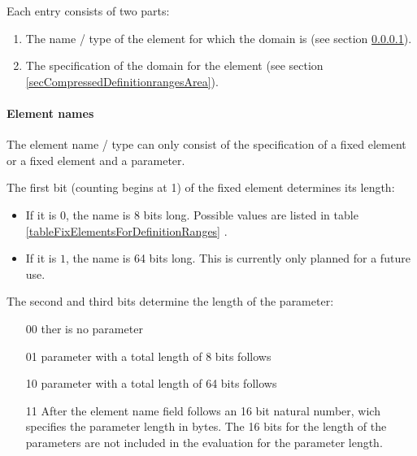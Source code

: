 \bigskip\noindent
Each entry consists of two parts:
\begin{enumerate}
 \item The name / type of the element for which the domain is (see section \ref{secCompressedDefinitionrangesElements}).
 \item The specification of the domain for the element (see section \ref{secCompressedDefinitionrangesArea}).
\end{enumerate}


\paragraph{Element names}
\label{secCompressedDefinitionrangesElements}

The element name / type can only consist of the specification of a fixed element or a fixed element and a parameter.

\bigskip\noindent
The first bit (counting begins at 1) of the fixed element determines its length:
\begin{itemize}
 \item If it is $0$, the name is 8 bits long. Possible values are listed in table \ref{tableFixElementsForDefinitionRanges} .
 \item If it is $1$, the name is 64 bits long. This is currently only planned for a future use.
\end{itemize}

\bigskip\noindent
The second and third bits determine the length of the parameter:
\begin{itemize}
 \item[00] ther is no parameter
 \item[01] parameter with a total length of 8 bits follows
 \item[10] parameter with a total length of 64 bits follows
 \item[11] After the element name field follows an 16 bit natural number, wich specifies the parameter length in bytes. The 16 bits for the length of the parameters are not included in the evaluation for the parameter length.
\end{itemize}


